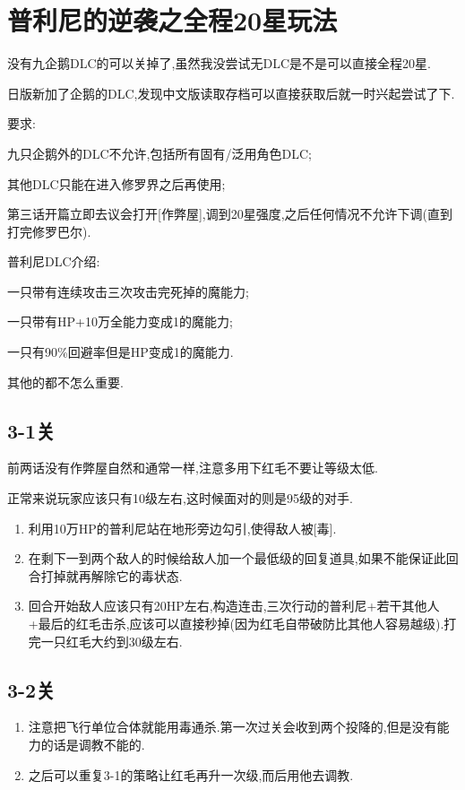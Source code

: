 \newpage

\section{普利尼的逆袭之全程20星玩法}

没有九企鹅DLC的可以关掉了,虽然我没尝试无DLC是不是可以直接全程20星.

日版新加了企鹅的DLC,发现中文版读取存档可以直接获取后就一时兴起尝试了下.

要求:

九只企鹅外的DLC不允许,包括所有固有/泛用角色DLC;

其他DLC只能在进入修罗界之后再使用;

第三话开篇立即去议会打开[作弊屋],调到20星强度,之后任何情况不允许下调(直到打完修罗巴尔).

普利尼DLC介绍:

一只带有连续攻击三次攻击完死掉的魔能力;

一只带有HP+10万全能力变成1的魔能力;

一只有90\%回避率但是HP变成1的魔能力.

其他的都不怎么重要.

	\newpage

	\subsection{3-1关}

	前两话没有作弊屋自然和通常一样,注意多用下红毛不要让等级太低.

	正常来说玩家应该只有10级左右,这时候面对的则是95级的对手.

		\begin{enumerate}
			\item 利用10万HP的普利尼站在地形旁边勾引,使得敌人被[毒].

			\item 在剩下一到两个敌人的时候给敌人加一个最低级的回复道具,如果不能保证此回合打掉就再解除它的毒状态.

			\item 回合开始敌人应该只有20HP左右,构造连击,三次行动的普利尼+若干其他人+最后的红毛击杀,应该可以直接秒掉(因为红毛自带破防比其他人容易越级).打完一只红毛大约到30级左右.
		\end{enumerate}

	\subsection{3-2关}
		\begin{enumerate}
			\item 注意把飞行单位合体就能用毒通杀.第一次过关会收到两个投降的,但是没有能力的话是调教不能的.

			\item 之后可以重复3-1的策略让红毛再升一次级,而后用他去调教.

		\end{enumerate}
	
